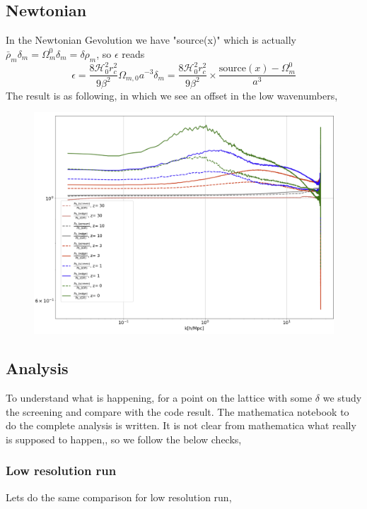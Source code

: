 \documentclass[a4paper,10pt]{article}
\def\be{\begin{equation}}
\def\ee{\end{equation}}
\newcommand{\HH}{\mathcal H}
\begin{document}
\subsection{Newtonian}
In the Newtonian Gevolution we have "source(x)" which is actually $\bar{\rho}_m \delta_m =\Omega_m^0 \delta_m = \delta \rho_m$, so $\epsilon$ reads
\be
\epsilon  =  \frac{8 \HH_0^2 r_c^2}{9 \beta^2} \Omega_{m,0} a^{-3} \delta_m =   \frac{8 \HH_0^2 r_c^2}{9 \beta^2} \times  \frac{ \text{source}(x)- \Omega_m^0}{a^3}
\ee
The result is as following, in which we see an offset in the low wavenumbers,
    \begin{figure}[H]
 \includegraphics[scale=0.5]{./Images/ndgp_005}  
 \end{figure} 
\subsection{Analysis}
To understand what is happening, for a point on the lattice with some $\delta$ we study the screening and compare with the code result. The mathematica notebook to do the complete analysis is written. It is not clear from mathematica what really is supposed to happen,, so we follow the below checks,
\subsubsection{Low resolution run}
Lets do the same comparison for low resolution run,
\end{document}
